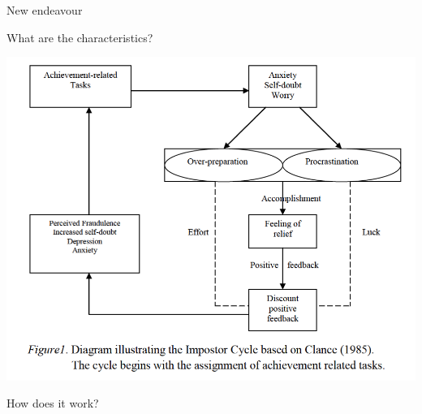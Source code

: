 \documentclass[aspectratio=169]{beamer}
\begin{document}
\begin{frame}
  \begin{center}
    \Huge New endeavour
    \\ \small \cite{apa13}
  \end{center}
\end{frame}

\begin{frame}
  \begin{center}
    \Huge What are the characteristics?
  \end{center}
\end{frame}

\begin{frame}
  \begin{center}
    \includegraphics[scale=.5]{./assets/clance-impostor-cycle.png}
    \\ \small \cite{sakulku11}
  \end{center}
\end{frame}

\begin{frame}
  \begin{center}
    \Huge How does it work?
    \\ \small \cite{hh15}
    \\ \small \cite{langford93}
  \end{center}
\end{frame}
\end{document}
